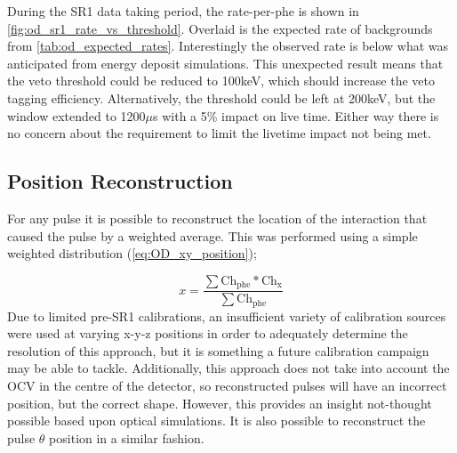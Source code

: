 

\par
During the SR1 data taking period, the rate-per-phe is shown in \autoref{fig:od_sr1_rate_vs_threshold}.
Overlaid is the expected rate of backgrounds from \autoref{tab:od_expected_rates}.
Interestingly the observed rate is below what was anticipated from energy deposit simulations.
This unexpected result means that the veto threshold could be reduced to 100keV, which should increase the veto tagging efficiency.
Alternatively, the threshold could be left at 200keV, but the window extended to 1200$\mu$s with a 5\% impact on live time.
Either way there is no concern about the requirement to limit the livetime impact not being met.



\subsection{Position Reconstruction}
\par
For any pulse it is possible to reconstruct the location of the interaction that caused the pulse by a weighted average.
This was performed using a simple weighted distribution (\autoref{eq:OD_xy_position});

\begin{equation}
    x = \frac{\sum{\text{Ch}_{\text{phe}} * \text{Ch}_\text{x}}}{\sum{\text{Ch}_\text{phe}}} 
\label{eq:OD_xy_position}
\end{equation}
Due to limited pre-SR1 calibrations, an insufficient variety of calibration sources were used at varying x-y-z positions in order to adequately determine the resolution of this approach, but it is something a future calibration campaign may be able to tackle. 
Additionally, this approach does not take into account the OCV in the centre of the detector, so reconstructed pulses will have an incorrect position, but the correct shape.
However, this provides an insight not-thought possible based upon optical simulations.
It is also possible to reconstruct the pulse $\theta$ position in a similar fashion.




